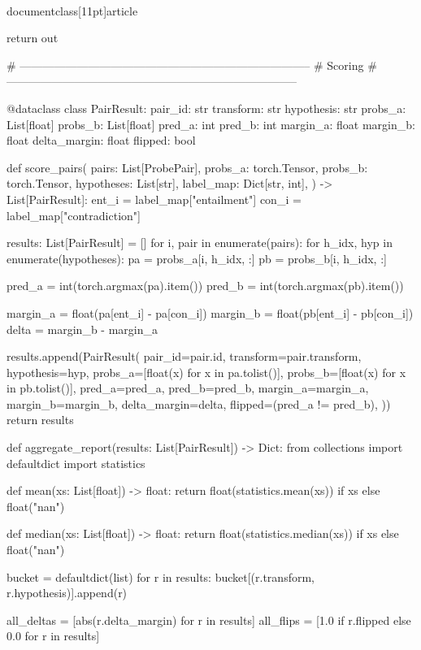 \\documentclass[11pt]{article}
\begin{document}
\begin{CodeBlock}
    return out


# -----------------------------------------------------------------------------
# Scoring
# -----------------------------------------------------------------------------

@dataclass
class PairResult:
    pair_id: str
    transform: str
    hypothesis: str
    probs_a: List[float]
    probs_b: List[float]
    pred_a: int
    pred_b: int
    margin_a: float
    margin_b: float
    delta_margin: float
    flipped: bool

def score_pairs(
    pairs: List[ProbePair],
    probs_a: torch.Tensor,
    probs_b: torch.Tensor,
    hypotheses: List[str],
    label_map: Dict[str, int],
) -> List[PairResult]:
    ent_i = label_map["entailment"]
    con_i = label_map["contradiction"]

    results: List[PairResult] = []
    for i, pair in enumerate(pairs):
        for h_idx, hyp in enumerate(hypotheses):
            pa = probs_a[i, h_idx, :]
            pb = probs_b[i, h_idx, :]

            pred_a = int(torch.argmax(pa).item())
            pred_b = int(torch.argmax(pb).item())

            margin_a = float(pa[ent_i] - pa[con_i])
            margin_b = float(pb[ent_i] - pb[con_i])
            delta = margin_b - margin_a

            results.append(PairResult(
                pair_id=pair.id,
                transform=pair.transform,
                hypothesis=hyp,
                probs_a=[float(x) for x in pa.tolist()],
                probs_b=[float(x) for x in pb.tolist()],
                pred_a=pred_a,
                pred_b=pred_b,
                margin_a=margin_a,
                margin_b=margin_b,
                delta_margin=delta,
                flipped=(pred_a != pred_b),
            ))
    return results

def aggregate_report(results: List[PairResult]) -> Dict:
    from collections import defaultdict
    import statistics

    def mean(xs: List[float]) -> float:
        return float(statistics.mean(xs)) if xs else float("nan")

    def median(xs: List[float]) -> float:
        return float(statistics.median(xs)) if xs else float("nan")

    bucket = defaultdict(list)
    for r in results:
        bucket[(r.transform, r.hypothesis)].append(r)

    all_deltas = [abs(r.delta_margin) for r in results]
    all_flips = [1.0 if r.flipped else 0.0 for r in results]


\end{CodeBlock}
\end{document}
